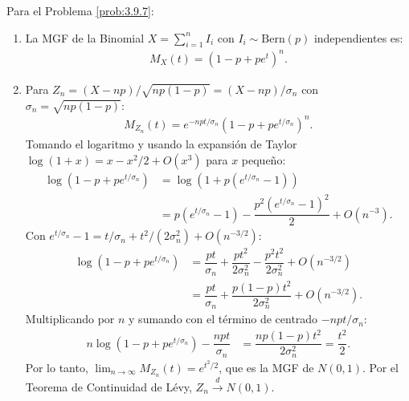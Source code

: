 \begin{solucion}
	\label{sol:3.9.7}
	Para el Problema \ref{prob:3.9.7}:
	\begin{enumerate}
		\item La MGF de la Binomial $X = \sum_{i=1}^{n} I_{i}$ con $I_{i} \sim \text{Bern}(p)$ independientes es:
		\begin{align*}
			M_{X}(t) = (1 - p + p e^{t})^{n}.
		\end{align*}
		\item Para $Z_{n} = (X - np)/\sqrt{np(1-p)} = (X - np)/\sigma_{n}$ con $\sigma_{n} = \sqrt{np(1-p)}$:
		\begin{align*}
			M_{Z_{n}}(t) = e^{-npt/\sigma_{n}} (1 - p + p e^{t/\sigma_{n}})^{n}.
		\end{align*}
		Tomando el logaritmo y usando la expansión de Taylor $\log(1 + x) = x - x^{2}/2 + O(x^{3})$ para $x$ pequeño:
		\begin{align*}
			\log(1 - p + p e^{t/\sigma_{n}}) &= \log(1 + p(e^{t/\sigma_{n}} - 1)) \\
			&= p(e^{t/\sigma_{n}} - 1) - \dfrac{p^{2}(e^{t/\sigma_{n}} - 1)^{2}}{2} + O(n^{-3}).
		\end{align*}
		Con $e^{t/\sigma_{n}} - 1 = t/\sigma_{n} + t^{2}/(2\sigma_{n}^{2}) + O(n^{-3/2})$:
		\begin{align*}
			\log(1 - p + p e^{t/\sigma_{n}}) &= \dfrac{pt}{\sigma_{n}} + \dfrac{pt^{2}}{2\sigma_{n}^{2}} - \dfrac{p^{2}t^{2}}{2\sigma_{n}^{2}} + O(n^{-3/2}) \\
			&= \dfrac{pt}{\sigma_{n}} + \dfrac{p(1-p)t^{2}}{2\sigma_{n}^{2}} + O(n^{-3/2}).
		\end{align*}
		Multiplicando por $n$ y sumando con el término de centrado $-npt/\sigma_{n}$:
		\begin{align*}
			n \log(1 - p + p e^{t/\sigma_{n}}) - \dfrac{npt}{\sigma_{n}} &= \dfrac{np(1-p)t^{2}}{2\sigma_{n}^{2}} = \dfrac{t^{2}}{2}.
		\end{align*}
		Por lo tanto, $\lim_{n \to \infty} M_{Z_{n}}(t) = e^{t^{2}/2}$, que es la MGF de $N(0, 1)$. Por el Teorema de Continuidad de Lévy, $Z_{n} \xrightarrow{d} N(0, 1)$. \qedhere
	\end{enumerate}
\end{solucion}

